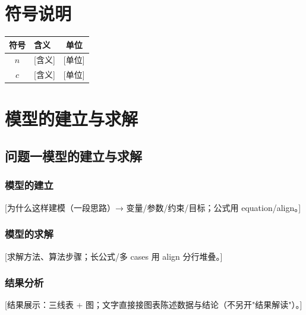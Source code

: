 \documentclass[12pt,a4paper]{article}
\begin{document}
\section{符号说明}
\begin{table}[htbp]
\centering
\begin{tabular}{clc}
\toprule
符号 & 含义 & 单位 \\
\midrule
$n$ & [含义] & [单位] \\
$c$ & [含义] & [单位] \\
\bottomrule
\end{tabular}
\end{table}

\section{模型的建立与求解}

\subsection{问题一模型的建立与求解}
\subsubsection*{模型的建立}
[为什么这样建模（一段思路）→ 变量/参数/约束/目标；公式用 equation/align。]
\subsubsection*{模型的求解}
[求解方法、算法步骤；长公式/多 cases 用 align 分行堆叠。]
\subsubsection*{结果分析}
[结果展示：三线表 + 图；文字直接接图表陈述数据与结论（不另开"结果解读"）。]
\end{document}
